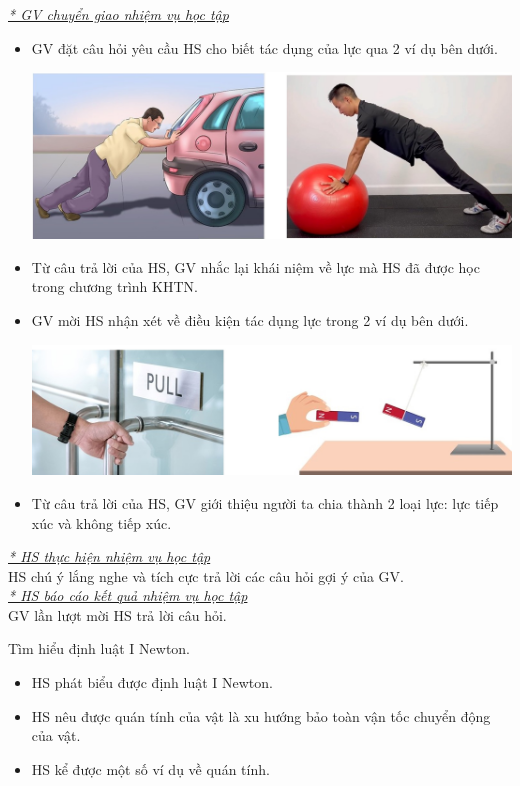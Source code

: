 {\textit{\underline{* GV chuyển giao nhiệm vụ học tập}}
	\begin{itemize}[label=-]
		\item GV đặt câu hỏi yêu cầu HS cho biết tác dụng của lực qua 2 ví dụ bên dưới.
		\begin{center}
			\includegraphics[scale=0.5]{figs/G10-BAI10-1}
		\end{center}
		\item Từ câu trả lời của HS, GV nhắc lại khái niệm về lực mà HS đã được học trong chương trình KHTN.
		\item GV mời HS nhận xét về điều kiện tác dụng lực trong 2 ví dụ bên dưới.
		\begin{center}
			\includegraphics[scale=0.5]{figs/G10-BAI10-2}
		\end{center}
		\item Từ câu trả lời của HS, GV giới thiệu người ta chia thành 2 loại lực: lực tiếp xúc và không tiếp xúc. 
	\end{itemize}
	\textit{\underline{* HS thực hiện nhiệm vụ học tập}}\\
	HS chú ý lắng nghe và tích cực trả lời các câu hỏi gợi ý của GV.\\
	\textit{\underline{* HS báo cáo kết quả nhiệm vụ học tập}}\\
	GV lần lượt mời HS trả lời câu hỏi.
	
}
\hoatdong
{Tìm hiểu định luật I Newton.
}
{\begin{itemize}
		\item HS phát biểu được định luật I Newton.
		\item HS nêu được quán tính của vật là xu hướng bảo toàn vận tốc chuyển động của vật.
		\item HS kể được một số ví dụ về quán tính.
	\end{itemize}
}
